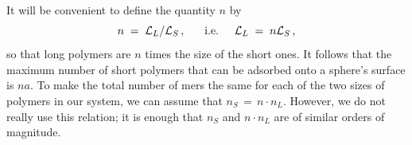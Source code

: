 \documentclass[journal=mamobx,manuscript=article]{achemso}
\newcommand{\leng}{\mathcal{L}}
\begin{document}
It will be convenient to define the quantity $n$ by \begin{equation}
   \label{eq.ndefn}
    n\;=\;\leng_L/\leng_S  \,,  \hspace{6mm}\hbox{i.e.}
     \hspace{5mm}  \leng_L  \;=\;  n\leng_S \,,
\end{equation}
so that
long polymers are $n$ times the size of the short ones.
It follows that the maximum number of short polymers
that can be adsorbed onto a sphere's surface is $na$.
To make the total %
number of mers the same for each
of the two sizes of polymers in our system,
we can assume that $n_S \,=\, n\cdot n_L$.  However, we do not really use this relation; it is enough that $n_S$ and $n\cdot n_L$
are of similar orders of magnitude.
\end{document}
